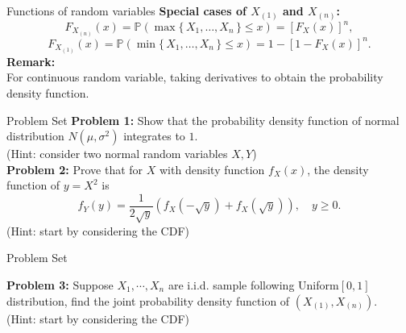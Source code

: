 \documentclass [aspectratio=169]{beamer}
\begin{document}
\begin{frame}{Functions of random variables}
\textbf{Special cases of $X_{(1)}$ and $X_{(n)}$:}\\
$$
{\displaystyle F_{X_{(n)}}(x)=\mathbb{P} (\max\{\,X_{1},\ldots ,X_{n}\,\}\leq x)=[F_{X}(x)]^{n}}, 
$$
$$
{\displaystyle F_{X_{(1)}}(x)=\mathbb{P} (\min\{\,X_{1},\ldots ,X_{n}\,\}\leq x)=1-[1-F_{X}(x)]^{n}}.
$$
\vspace{0.1in}
\textbf{Remark:}\\
For continuous random variable, taking derivatives to obtain the probability density function. 
\end{frame}


\begin{frame}{Problem Set}
    \textbf{Problem 1:}  Show that the probability density function of normal distribution $N(\mu, \sigma^2)$ integrates to $1$. \\
    (Hint: consider two normal random variables $X, Y$)\\
    \vspace{0.1in}
     \textbf{Problem 2:} Prove that for $X$ with density function $f_X(x)$, the density function of $y = X^2$ is
     $$
     f_Y(y) = \dfrac{1}{2\sqrt{y}}(f_X(-\sqrt{y}) + f_X(\sqrt{y}) ), \quad y \ge 0.
     $$
     (Hint: start by considering the CDF)
 \vspace{0.1in}
\end{frame}


\begin{frame}{Problem Set}

   \textbf{Problem 3:} Suppose $X_1, \cdots, X_n$ are i.i.d. sample following Uniform$[0,1]$ distribution, find the joint probability density function of $(X_{(1)}, X_{(n)})$.
  \\
  (Hint: start by considering the CDF)

\end{frame}
\end{document}
